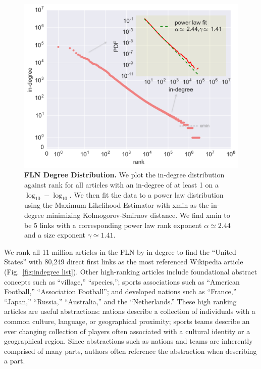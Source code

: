\documentclass[pre,twocolumn,twoside,superscriptaddress,floatfix]{revtex4-1}
\begin{document}
{\begin{figure}[tp!]
  \includegraphics[width=\columnwidth]{ndegree_loglog.pdf}
  \caption{
    \textbf{FLN Degree Distribution.}
    We plot the in-degree distribution against rank for all articles with an in-degree of at least 1 on a $\log_{10}-\log_{10}$. We then fit the data to a power law 
    distribution using the Maximum Likelihood Estimator with xmin as the in-degree minimizing Kolmogorov-Smirnov distance. We find xmin to be 5 links with a corresponding power law rank exponent $\alpha \simeq 2.44$ and a size exponent $\gamma \simeq 1.41$.
}
  \label{fig:degree distribution}
\end{figure}

We rank all 11 million articles in the FLN by in-degree to find 
the ``United States'' with 80,249 direct first links as the most referenced
Wikipedia article 
(Fig.~\ref{fig:indegree list}). 
Other high-ranking articles
include foundational abstract concepts such as ``village,'' ``species,''; 
sports associations such as ``American Football,'' ``Association Football''; 
and developed nations such as ``France,'' ``Japan,'' ``Russia,'' ``Australia,'' and 
the ``Netherlands.'' These high ranking articles are useful abstractions: nations
describe a collection of individuals with a common culture, language, or 
geographical proximity; sports teams describe an ever changing collection of 
players often associated with a cultural identity or a geographical 
region. 
Since abstractions such as nations and teams are inherently comprised
of many parts, authors often reference the abstraction when describing a part.

}
\end{document}
